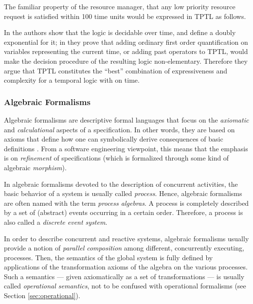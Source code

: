 The familiar property of the resource manager, that any low priority 
resource request is satisfied within 100 time units would be 
expressed in TPTL as follows. 


In \cite{AH94} the authors show that the logic is decidable over  
time, and define a doubly exponential  for 
it; in \cite{AH92} they prove that adding ordinary first order quantification 
on variables representing the current time, or adding past operators 
to TPTL, would make the decision procedure of the resulting logic 
non-elementary. Therefore they argue that TPTL constitutes the 
``best'' combination of expressiveness and complexity for a temporal 
logic with  on time.



\subsubsection{Algebraic Formalisms} \label{sec:algebraic}
Algebraic formalisms are descriptive formal languages that focus 
on the \emph{axiomatic} and \emph{calculational} aspects of a specification. 
In other words, they are based on axioms that define how one 
can symbolically derive consequences of basic definitions \cite{Bae04,Bae03}. 
From a software engineering viewpoint, this means that the emphasis 
is on \emph{refinement} of specifications (which is formalized through 
some kind of algebraic \emph{morphism}).

In algebraic formalisms devoted to the description of concurrent 
activities, the basic behavior of a system is usually called \emph{process}. 
Hence, algebraic formalisms are often named with the term \emph{process 
algebras}. A process is completely described by a set of (abstract) 
events occurring in a certain order. Therefore, a process is 
also called a \emph{discrete event system}.

In order to describe concurrent and reactive systems, algebraic 
formalisms usually provide a notion of \emph{parallel composition} 
among different, concurrently executing, processes. Then, the 
semantics of the global system is fully defined by applications 
of the transformation axioms of the algebra on the various processes. 
Such a semantics --- given axiomatically as a set of transformations 
--- is usually called \emph{operational semantics}, not to be confused 
with operational formalisms (see Section \ref{sec:operational}).


